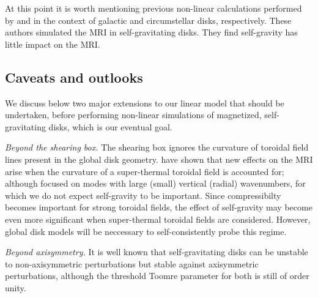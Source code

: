 At this point it is worth mentioning previous non-linear calculations 
performed by \cite{kim03} and \cite{fromang04a,fromang04} in the
context of galactic and circumstellar disks, respectively. These
authors simulated the MRI in self-gravitating disks. They find
self-gravity has little impact on the MRI.   














\subsection{Caveats and outlooks}
We discuss below two major extensions to our linear model that
should be undertaken, before performing non-linear simulations of
magnetized, self-gravitating disks, which is our eventual goal.  

\emph{Beyond the shearing box.} The shearing box ignores the curvature
of toroidal field lines present in the global disk
geometry. \cite{pessah05} have shown that new effects on the MRI arise
when the curvature of a super-thermal toroidal field is accounted for;
although \citeauthor{pessah05} focused on modes with large (small)
vertical (radial) wavenumbers, for which we do not expect self-gravity
to be important. Since compressibilty becomes important for strong
toroidal fields, the effect of self-gravity may become even more
significant when super-thermal toroidal fields are
considered. However, global disk models will be neccessary
to self-consistently probe this regime. 

%




\emph{Beyond axisymmetry.} It is well known that self-gravitating
disks can be unstable to non-axisymmetric perturbations but stable
against axisymmetric perturbations, although the threshold Toomre
parameter for both is still of order unity. %
 


